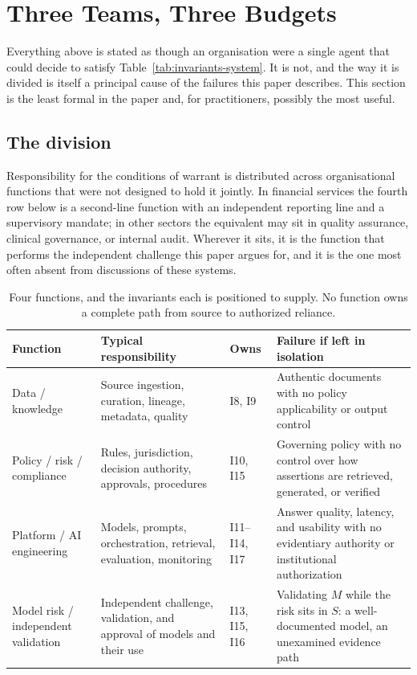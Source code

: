 \section{Three Teams, Three Budgets}
\label{sec:three-teams}

Everything above is stated as though an organisation were a single agent that could
decide to satisfy Table~\ref{tab:invariants-system}. It is not, and the way it is
divided is itself a principal cause of the failures this paper describes. This
section is the least formal in the paper and, for practitioners, possibly the most
useful.

\subsection{The division}

Responsibility for the conditions of warrant is distributed across organisational
functions that were not designed to hold it jointly. In financial services the fourth
row below is a second-line function with an independent reporting line and a
supervisory mandate; in other sectors the equivalent may sit in quality assurance,
clinical governance, or internal audit. Wherever it sits, it is the function that
performs the independent challenge this paper argues for, and it is the one most often
absent from discussions of these systems.

\begin{table}[ht]
  \centering
  \small
  \begin{tabular}{@{}>{\raggedright\arraybackslash}p{2.8cm}>{\raggedright\arraybackslash}p{4.6cm}>{\raggedright\arraybackslash}p{2.4cm}>{\raggedright\arraybackslash}p{4.0cm}@{}}
    \toprule
    Function & Typical responsibility & Owns & Failure if left in isolation \\
    \midrule
    Data / knowledge
      & Source ingestion, curation, lineage, metadata, quality
      & I8, I9
      & Authentic documents with no policy applicability or output control \\
    \addlinespace
    Policy / risk / compliance
      & Rules, jurisdiction, decision authority, approvals, procedures
      & I10, I15
      & Governing policy with no control over how assertions are retrieved,
        generated, or verified \\
    \addlinespace
    Platform / AI engineering
      & Models, prompts, orchestration, retrieval, evaluation, monitoring
      & I11--I14, I17
      & Answer quality, latency, and usability with no evidentiary authority or
        institutional authorization \\
    \addlinespace
    Model risk / independent validation
      & Independent challenge, validation, and approval of models and their use
      & I13, I15, I16
      & Validating $M$ while the risk sits in $S$: a well-documented model, an
        unexamined evidence path \\
    \bottomrule
  \end{tabular}
  \caption{Four functions, and the invariants each is positioned to supply. No
    function owns a complete path from source to authorized reliance.}
  \label{tab:three-teams}
\end{table}


